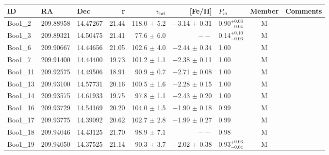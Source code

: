 \begin{table*}[t]
\centering
\tiny
\caption{Properties of Bo{\"o}tes I member stars and VCMNs (stars with radial velocities within $\pm$30 km s$^{-1}$ of the UFD's velocity). Column (1) is the star ID, the coordinates are given in columns (2) and (3), and column (4) is the r-band magnitude. Columns (5) and (6) are the measured radial velocities and metallicities, respectively. Column (7) provides the membership probabilities described in \S\ref{sec:members}. Uncertainties on the membership probabilities are reported when the uncertainties are larger than 0.01. Column (8) provides the results of our subjective membership selection, including members (indicated by `M') and VCNMs. The final column contains additional notes. Columns (7) to (9) correspond to columns (8) to (10) in Table~\ref{tab:table_Bootes_members} and Table~\ref{tab:table_leov_members}.} \label{tab:table_Bootes_members}
\centering
\begin{tabular}{lllrrrlcl}
\hline
\hline
 ID& RA & Dec & r & $v_\mathrm{hel}$ & [Fe/H] & $P_m$ & Member & Comments\\
\hline
Boo1\_2 & 209.88958 & 14.47267 & 21.44 & 118.0  $\pm$ 5.2 & $-$3.14  $\pm$ 0.31 & 0.90$^{+0.03}_{-0.04}$ & M & \\ 
Boo1\_3 & 209.89321 & 14.50475 & 21.41 & 77.6  $\pm$ 6.0 & $--$  & 0.14$^{+0.10}_{-0.06}$ & M & \\ 
Boo1\_6 & 209.90667 & 14.44656 & 21.05 & 102.6  $\pm$ 4.0 & $-$2.44  $\pm$ 0.34 & 1.00 & M & \\ 
Boo1\_7 & 209.91400 & 14.44400 & 19.73 & 101.2  $\pm$ 1.1 & $-$2.38  $\pm$ 0.11 & 1.00 & M & \\ 
Boo1\_11 & 209.92575 & 14.49506 & 18.91 & 90.9  $\pm$ 0.7 & $-$2.71  $\pm$ 0.08 & 1.00 & M & \\ 
Boo1\_13 & 209.93100 & 14.57731 & 20.16 & 100.5  $\pm$ 1.6 & $-$2.28  $\pm$ 0.15 & 1.00 & M & \\ 
Boo1\_14 & 209.93575 & 14.61933 & 19.75 & 97.8  $\pm$ 1.1 & $-$2.43  $\pm$ 0.20 & 1.00 & M & \\ 
Boo1\_16 & 209.93729 & 14.54169 & 20.20 & 104.0  $\pm$ 1.5 & $-$1.90  $\pm$ 0.18 & 0.99 & M & \\ 
Boo1\_17 & 209.93775 & 14.39092 & 20.62 & 102.7  $\pm$ 2.8 & $-$1.99  $\pm$ 0.27 & 0.99 & M & \\ 
Boo1\_18 & 209.94046 & 14.43125 & 21.70 & 98.9  $\pm$ 7.1 & $--$  & 0.98 & M & \\ 
Boo1\_19 & 209.94050 & 14.37525 & 21.14 & 90.3  $\pm$ 3.7 & $-$2.02  $\pm$ 0.38 & 0.93$^{+0.03}_{-0.04}$ & M & \\ 

\end{tabular}
\end{table*}
